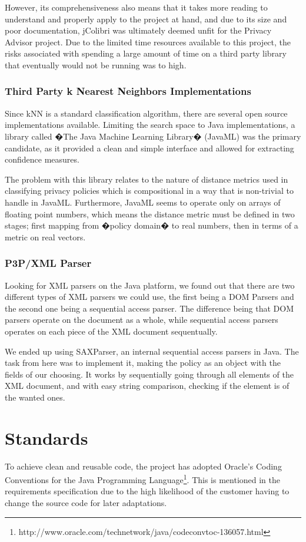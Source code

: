 However, its comprehensiveness also means that it takes more reading to understand and properly apply to the project at hand, and due to its size and poor documentation, jColibri was ultimately deemed unfit for the Privacy Advisor project. Due to the limited time resources available to this project, the risks associated with spending a large amount of time on a third party library that eventually would not be running was to high.
 
\subsubsection{Third Party k Nearest Neighbors Implementations}
Since kNN is a standard classification algorithm, there are several open source implementations available. Limiting the search space to Java implementations, a library called �The Java Machine Learning Library� (JavaML) was the primary candidate, as it provided a clean and simple interface and allowed for extracting confidence measures.
 
The problem with this library relates to the nature of distance metrics used in classifying privacy policies which is compositional in a way that is non-trivial to handle in JavaML. Furthermore, JavaML seems to operate only on arrays of floating point numbers, which means the distance metric must be defined in two stages; first mapping from �policy domain� to real numbers, then in terms of a metric on real vectors.

\subsubsection{P3P/XML Parser}
Looking for XML parsers on the Java platform, we found out that there are two different types of XML parsers we could use, the first being a DOM Parsers and the second one being a sequential access parser. The difference being that DOM parsers operate on the document as a whole, while sequential access parsers operates on each piece of the XML document sequentually.

We ended up using SAXParser, an internal sequential access parsers in Java. The task from here was to implement it, making the policy as an object with the fields of our choosing. It works by sequentially going through all elements of the XML document, and with easy string comparison, checking if the element is of the wanted ones.



\section{Standards}
To achieve clean and reusable code, the project has adopted Oracle's Coding Conventions for the Java Programming Language\footnote{http://www.oracle.com/technetwork/java/codeconvtoc-136057.html}. This is mentioned in the requirements specification due to the high likelihood of the customer having to change the source code for later adaptations.




